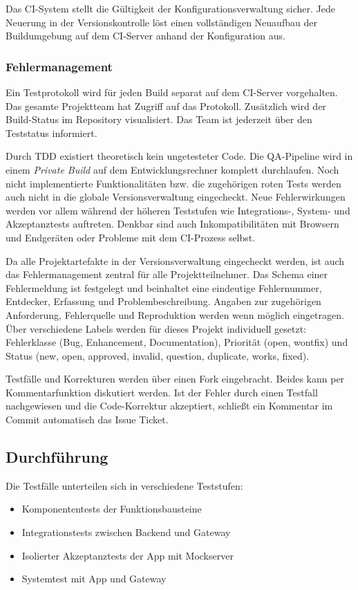 Das CI-System stellt die Gültigkeit der Konfigurationsverwaltung sicher. Jede Neuerung in der Versionskontrolle löst einen vollständigen Neuaufbau der Buildumgebung auf dem CI-Server anhand der Konfiguration aus.


\subsubsection{Fehlermanagement}
Ein Testprotokoll wird für jeden Build separat auf dem CI-Server vorgehalten. Das gesamte Projektteam hat Zugriff auf das Protokoll. Zusätzlich wird der Build-Status im Repository visualisiert. Das Team ist jederzeit über den Teststatus informiert.

Durch \ac{TDD} existiert theoretisch kein ungetesteter Code. Die QA-Pipeline wird in einem \textit{Private Build} auf dem Entwicklungsrechner komplett durchlaufen. Noch nicht implementierte Funktionalitäten bzw. die zugehörigen roten Tests werden auch nicht in die globale Versionsverwaltung eingecheckt. Neue Fehlerwirkungen werden vor allem während der höheren Teststufen wie Integrations-, System- und Akzeptanztests auftreten. Denkbar sind auch Inkompatibilitäten mit Browsern und Endgeräten oder Probleme mit dem CI-Prozess selbst.

 Da alle Projektartefakte in der Versionsverwaltung eingecheckt werden, ist auch das Fehlermanagement zentral für alle Projektteilnehmer. Das Schema einer Fehlermeldung ist festgelegt und beinhaltet eine eindeutige Fehlernummer, Entdecker, Erfassung und Problembeschreibung. Angaben zur zugehörigen Anforderung, Fehlerquelle und Reproduktion werden wenn möglich eingetragen. Über verschiedene Labels werden für dieses Projekt individuell gesetzt: Fehlerklasse (Bug, Enhancement, Documentation), Priorität (open, wontfix) und Status (new, open, approved, invalid, question, duplicate, works, fixed).

Testfälle und Korrekturen werden über einen Fork eingebracht. Beides kann per Kommentarfunktion diskutiert werden. Ist der Fehler durch einen Testfall nachgewiesen und die Code-Korrektur akzeptiert, schließt ein Kommentar im Commit automatisch das Issue Ticket.


\subsection{Durchführung}
\label{sec:tests}
Die Testfälle unterteilen sich in verschiedene Teststufen:
\begin{itemize}
	\item Komponententests der Funktionsbausteine
	\item Integrationstests zwischen Backend und Gateway
	\item Isolierter Akzeptanztests der App mit Mockserver
	\item Systemtest mit App und Gateway
\end{itemize}

